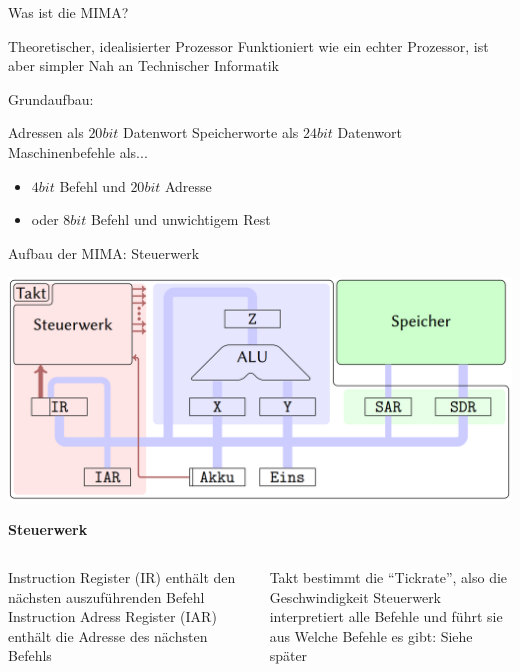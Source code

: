 \begin{frame}{Was ist die MIMA?}
	\begin{itemize}
		\pitem Theoretischer, idealisierter Prozessor
		\pitem Funktioniert wie ein echter Prozessor, ist aber simpler
		\pitem Nah an Technischer Informatik
	\end{itemize}

	\bp
	
	Grundaufbau:
	
	\begin{itemize}
		\pitem Adressen als $20bit$ Datenwort
		\pitem Speicherworte als $24bit$ Datenwort
		\pitem Maschinenbefehle als...
		\begin{itemize}
			\item $4bit$ Befehl und $20bit$ Adresse
			\item oder $8bit$ Befehl und unwichtigem Rest
		\end{itemize}
	\end{itemize}
\end{frame}

\begin{frame}{Aufbau der MIMA: Steuerwerk}
	\begin{center}\includegraphics[width=.6\textwidth]{images/mima_aufbau.png}\end{center}
	
	\bp
	
	\textcolor{kit-red50}{\textbf{Steuerwerk}}
	
	\begin{columns}
		\begin{column}{0.5\textwidth}
			\begin{itemize}
				\pitem Instruction Register (IR) enthält den nächsten auszuführenden Befehl
				\pitem Instruction Adress Register (IAR) enthält die Adresse des nächsten Befehls
			\end{itemize}
		\end{column}
		
		\begin{column}{0.5\textwidth}
			\begin{itemize}
				\pitem Takt bestimmt die ``Tickrate'', also die Geschwindigkeit
				\pitem Steuerwerk interpretiert alle Befehle und führt sie aus
				\pitem Welche Befehle es gibt: Siehe später
			\end{itemize}
		\end{column}
	\end{columns}
	
\end{frame}


